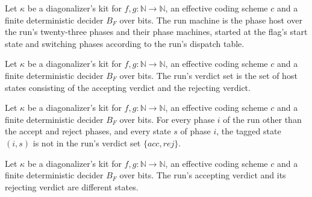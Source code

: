 \begin{definition}
\label{Turing.NTimeDiag.dzQ}
\leanok
{}
Let $\kappa$ be a diagonalizer's kit for $f, g : \mathbb{N} \to \mathbb{N}$, an effective coding scheme $c$ and a finite deterministic decider $B_F$ over bits. The run machine is the phase host over the run's twenty-three phases and their phase machines, started at the flag's start state and switching phases according to the run's dispatch table.
\end{definition}

\begin{definition}
\label{Turing.NTimeDiag.dzQF}
\leanok
{}
Let $\kappa$ be a diagonalizer's kit for $f, g : \mathbb{N} \to \mathbb{N}$, an effective coding scheme $c$ and a finite deterministic decider $B_F$ over bits. The run's verdict set is the set of host states consisting of the accepting verdict and the rejecting verdict.
\end{definition}

\begin{theorem}
\label{Turing.NTimeDiag.dz_notF}
\leanok
{}
Let $\kappa$ be a diagonalizer's kit for $f, g : \mathbb{N} \to \mathbb{N}$, an effective coding scheme $c$ and a finite deterministic decider $B_F$ over bits. For every phase $i$ of the run other than the accept and reject phases, and every state $s$ of phase $i$, the tagged state $(i, s)$ is not in the run's verdict set $\{\mathit{acc}, \mathit{rej}\}$.
\end{theorem}

\begin{theorem}
\label{Turing.NTimeDiag.dz_acc_ne_rej}
\leanok
{}
Let $\kappa$ be a diagonalizer's kit for $f, g : \mathbb{N} \to \mathbb{N}$, an effective coding scheme $c$ and a finite deterministic decider $B_F$ over bits. The run's accepting verdict and its rejecting verdict are different states.
\end{theorem}

